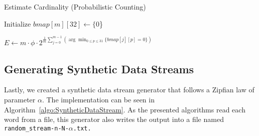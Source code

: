 \documentclass[a4paper, 11pt]{article}
\begin{document}
\begin{algorithm}[H]
    \caption{Estimate Cardinality (Probabilistic Counting)}
    \label{algo:PCSA}
    \SetAlgoLined
    \BlankLine


    Initialize $bmap[m][32] \gets \{0$\}\;

    \BlankLine

    \BlankLine

    $E \gets m \cdot \phi \cdot 2^{\frac{1}{m} \sum_{j=0}^{m-1} \left(\arg\min_{0 \leq p \leq 31} \{ bmap[j][p] = 0 \} \right)}$\; %
    
    \;
\end{algorithm}


\subsection{Generating Synthetic Data Streams}
Lastly, we created a synthetic data stream generator that follows a Zipfian law of parameter $\alpha$. The implementation can be seen in Algorithm~\ref{algo:SyntheticDataStream}. As the presented algorithms read each word from a file, this generator also writes the output into a file named \tt{random\_stream-n-N-$\alpha$.txt}.  
\end{document}
